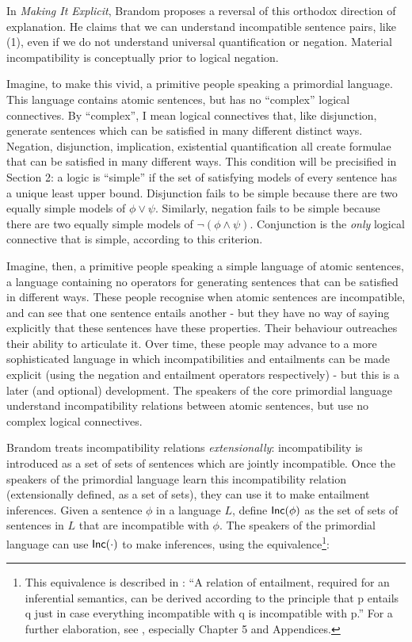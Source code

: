 \NI In \emph{Making It Explicit}, Brandom proposes a reversal of this
orthodox direction of explanation.  He claims that we can understand
incompatible sentence pairs, like (1), even if we do not understand
universal quantification or negation.  Material incompatibility is
conceptually prior to logical negation.

\NI Imagine, to make this vivid, a primitive people speaking a
primordial language.  This language contains atomic sentences, but has
no ``complex'' logical connectives.  By ``complex'', I mean logical
connectives that, like disjunction, generate sentences which can be
satisfied in many different distinct ways.  Negation, disjunction,
implication, existential quantification all create formulae that can
be satisfied in many different ways. This condition will be
precisified in Section 2: a logic is ``simple'' if the set of
satisfying models of every sentence has a unique least upper
bound. Disjunction fails to be simple because there are two equally
simple models of $\phi \lor \psi$. Similarly, negation fails to be simple
because there are two equally simple models of $\neg (\phi \land
\psi)$. Conjunction is the \emph{only} logical connective that is simple,
according to this criterion.

\NI Imagine, then, a primitive people speaking a simple language of
atomic sentences, a language containing no operators for generating
sentences that can be satisfied in different ways.  These people
recognise when atomic sentences are incompatible, and can see that one
sentence entails another - but they have no way of saying explicitly
that these sentences have these properties.  Their behaviour
outreaches their ability to articulate it.  Over time, these people
may advance to a more sophisticated language in which
incompatibilities and entailments can be made explicit (using the
negation and entailment operators respectively) - but this is a later
(and optional) development. The speakers of the core primordial
language understand incompatibility relations between atomic
sentences, but use no complex logical connectives.

Brandom treats incompatibility relations \emph{extensionally}:
incompatibility is introduced as a set of sets of sentences which are
jointly incompatible.  Once the speakers of the primordial language
learn this incompatibility relation (extensionally defined, as a set
of sets), they can use it to make entailment inferences.  Given a
sentence $\phi$ in a language $L$, define $\mathsf{Inc}(\phi)$ as the set of sets of
sentences in $L$ that are incompatible with $\phi$.  The speakers of the
primordial language can use $\mathsf{Inc}(\cdot)$ to make inferences, using the
equivalence\footnote{This equivalence is described in \cite{brandom2}:
  ``A relation of entailment, required for an inferential semantics,
  can be derived according to the principle that p entails q just in
  case everything incompatible with q is incompatible with p.'' For a
  further elaboration, see \cite{brandom}, especially Chapter 5 and
  Appendices.}:

